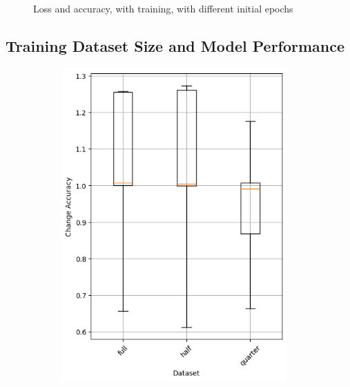\begin{figure}
\begin{subfigure}{0.5\textwidth}
    \end{subfigure}
    \caption{Loss and accuracy, with training, with different initial epochs}
    \label{fig:initial-epochs-training}
\end{figure}
\subsection{Training Dataset Size and Model Performance}\label{subsec:training-dataset-size-and-model-performance}
\begin{figure}
    \begin{subfigure}{0.5\textwidth}
        \centering
        \includegraphics[width=0.95\textwidth]{plots/Dataset_NotTrained_accuracy.png}
    \end{subfigure}
    \begin{subfigure}{0.5\textwidth}
        \centering

\end{subfigure}
\end{figure}
